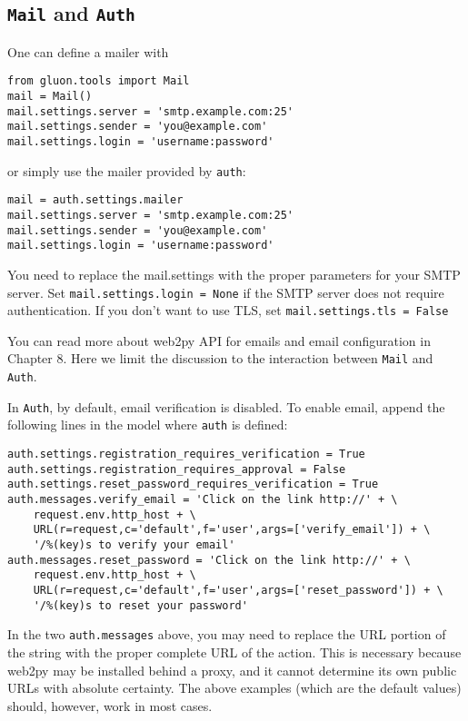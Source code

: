 \documentclass[justified,sixbynine,notoc]{tufte-book}
\def\ft{\small\tt}
\begin{document}
\begin{fullwidth}
\goodbreak\subsection{{\ft Mail} and {\ft Auth}}

One can define a mailer with

\begin{lstlisting}
from gluon.tools import Mail
mail = Mail()
mail.settings.server = 'smtp.example.com:25'
mail.settings.sender = 'you@example.com'
mail.settings.login = 'username:password'

\end{lstlisting}
\noindent or simply use the mailer provided by {\ft auth}:

\begin{lstlisting}
mail = auth.settings.mailer
mail.settings.server = 'smtp.example.com:25'
mail.settings.sender = 'you@example.com'
mail.settings.login = 'username:password'
\end{lstlisting}

You need to replace the mail.settings with the proper parameters for your SMTP server. Set {\ft mail.settings.login = None} if the SMTP server does not require authentication. If you don't want to use TLS, set {\ft mail.settings.tls = False}

You can read more about web2py API for emails and email configuration in Chapter 8. Here we limit the discussion to the interaction between {\ft Mail} and {\ft Auth}.

In {\ft Auth}, by default, email verification is disabled.
To enable email, append the following lines in the model where {\ft auth} is defined:

\begin{lstlisting}
auth.settings.registration_requires_verification = True
auth.settings.registration_requires_approval = False
auth.settings.reset_password_requires_verification = True
auth.messages.verify_email = 'Click on the link http://' + \
    request.env.http_host + \
    URL(r=request,c='default',f='user',args=['verify_email']) + \
    '/%(key)s to verify your email'
auth.messages.reset_password = 'Click on the link http://' + \
    request.env.http_host + \
    URL(r=request,c='default',f='user',args=['reset_password']) + \
    '/%(key)s to reset your password'
\end{lstlisting}

In the two {\ft auth.messages} above, you may need to replace the URL portion of the string with the proper complete URL of the action. This is necessary because web2py may be installed behind a proxy, and it cannot determine its own public URLs with absolute certainty. The above examples (which are the default values) should, however, work in most cases.


\end{fullwidth}
\end{document}
